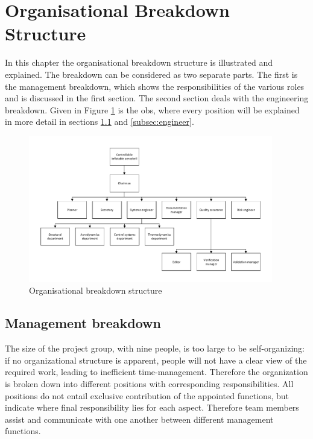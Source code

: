 \section{Organisational Breakdown Structure}\label{cha:OBS}
In this chapter the organisational breakdown structure is illustrated and explained. The breakdown can be considered as two separate parts. The first is the management breakdown, which shows the responsibilities of the various roles and is discussed in the first section. The second section deals with the engineering breakdown. Given in Figure \ref{fig:OBS} is the \gls{obs}, where every position will be explained in more detail in sections \ref{subsec:management} and \ref{subsec:engineer}.

\begin{figure}[h]
\centering
\includegraphics[width=0.95\textwidth]{./Figure/OBS.pdf}
\caption{Organisational breakdown structure} \label{fig:OBS}
\end{figure}

\subsection{Management breakdown}\label{subsec:management}
The size of the project group, with nine people, is too large to be self-organizing: if no organizational structure is apparent, people will not have a clear view of the required work, leading to inefficient time-management. Therefore the organization is broken down into different positions with corresponding responsibilities. All positions do not entail exclusive contribution of the appointed functions, but indicate where final responsibility lies for each aspect. Therefore team members assist and communicate with one another between different management functions.


